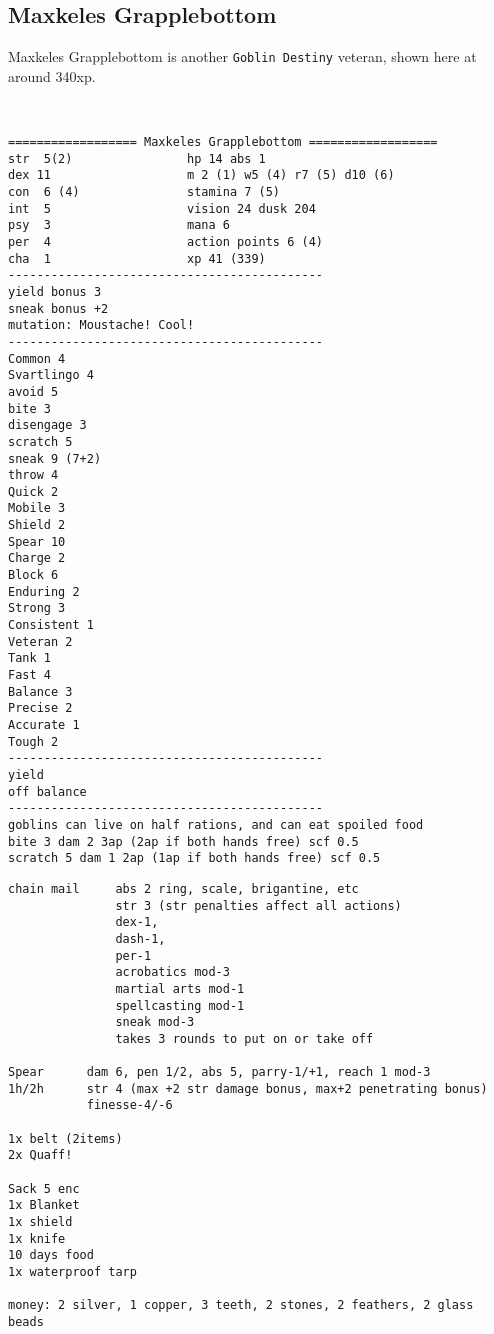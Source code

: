 \clearpage
\begin{samepage}
\subsection*{Maxkeles Grapplebottom}
\noindent Maxkeles Grapplebottom is another \texttt{Goblin Destiny} veteran, shown here at around 340xp.

\

\small \begin{verbatim}
================== Maxkeles Grapplebottom ==================
str  5(2)                hp 14 abs 1
dex 11                   m 2 (1) w5 (4) r7 (5) d10 (6)
con  6 (4)               stamina 7 (5)
int  5                   vision 24 dusk 204
psy  3                   mana 6
per  4                   action points 6 (4)
cha  1                   xp 41 (339)
--------------------------------------------
yield bonus 3
sneak bonus +2
mutation: Moustache! Cool!
--------------------------------------------
Common 4
Svartlingo 4
avoid 5
bite 3
disengage 3
scratch 5
sneak 9 (7+2)
throw 4
Quick 2
Mobile 3
Shield 2
Spear 10
Charge 2
Block 6
Enduring 2
Strong 3
Consistent 1
Veteran 2
Tank 1
Fast 4
Balance 3
Precise 2
Accurate 1
Tough 2
--------------------------------------------
yield
off balance
--------------------------------------------
goblins can live on half rations, and can eat spoiled food
bite 3 dam 2 3ap (2ap if both hands free) scf 0.5
scratch 5 dam 1 2ap (1ap if both hands free) scf 0.5
\end{verbatim} \end{samepage} \clearpage \begin{samepage} \begin{verbatim}
chain mail     abs 2 ring, scale, brigantine, etc
               str 3 (str penalties affect all actions)
               dex-1,
               dash-1,
               per-1
               acrobatics mod-3
               martial arts mod-1
               spellcasting mod-1
               sneak mod-3
               takes 3 rounds to put on or take off

Spear      dam 6, pen 1/2, abs 5, parry-1/+1, reach 1 mod-3
1h/2h      str 4 (max +2 str damage bonus, max+2 penetrating bonus)
           finesse-4/-6

1x belt (2items)
2x Quaff!

Sack 5 enc
1x Blanket
1x shield
1x knife
10 days food
1x waterproof tarp

money: 2 silver, 1 copper, 3 teeth, 2 stones, 2 feathers, 2 glass beads
\end{verbatim} \end{samepage} \normalsize






